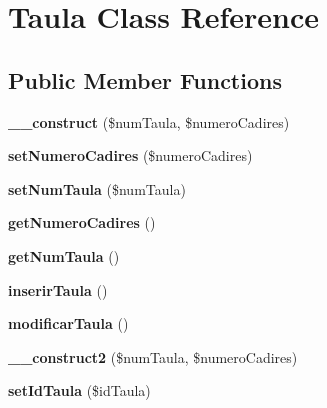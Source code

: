 \hypertarget{classTaula}{}\section{Taula Class Reference}
\label{classTaula}
\subsection*{Public Member Functions}
\begin{DoxyCompactItemize}
\item 
{\bfseries \+\_\+\+\_\+construct} (\$num\+Taula, \$numero\+Cadires)\hypertarget{classTaula_a8a8f0e830832e7a33d2d07c434d6d408}{}\label{classTaula_a8a8f0e830832e7a33d2d07c434d6d408}

\item 
{\bfseries set\+Numero\+Cadires} (\$numero\+Cadires)\hypertarget{classTaula_a71e3995e42b14c8b2da3a8fc2b529203}{}\label{classTaula_a71e3995e42b14c8b2da3a8fc2b529203}

\item 
{\bfseries set\+Num\+Taula} (\$num\+Taula)\hypertarget{classTaula_aebd9a63ca9e6c9b7b79faa070d53a364}{}\label{classTaula_aebd9a63ca9e6c9b7b79faa070d53a364}

\item 
{\bfseries get\+Numero\+Cadires} ()\hypertarget{classTaula_a7f166de0543533fd808e68654b950f94}{}\label{classTaula_a7f166de0543533fd808e68654b950f94}

\item 
{\bfseries get\+Num\+Taula} ()\hypertarget{classTaula_a3b23f2c9d06d22a755bee60b81164f8c}{}\label{classTaula_a3b23f2c9d06d22a755bee60b81164f8c}

\item 
{\bfseries inserir\+Taula} ()\hypertarget{classTaula_a1c8949f1fee098a265f19435a87e4884}{}\label{classTaula_a1c8949f1fee098a265f19435a87e4884}

\item 
{\bfseries modificar\+Taula} ()\hypertarget{classTaula_a486e9dc0f340dc8f43eef17d4c4c979a}{}\label{classTaula_a486e9dc0f340dc8f43eef17d4c4c979a}

\item 
{\bfseries \+\_\+\+\_\+construct2} (\$num\+Taula, \$numero\+Cadires)\hypertarget{classTaula_a077051307c2c2f641bd48d03cedad292}{}\label{classTaula_a077051307c2c2f641bd48d03cedad292}

\item 
{\bfseries set\+Id\+Taula} (\$id\+Taula)\hypertarget{classTaula_a616b1a14c6d5b91fd792187e1c740454}{}\label{classTaula_a616b1a14c6d5b91fd792187e1c740454}


\end{DoxyCompactItemize}
